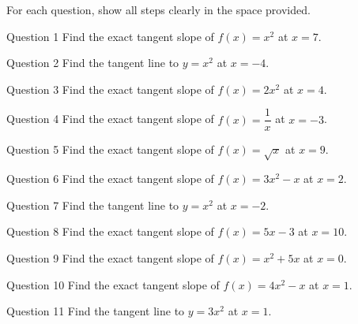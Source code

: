 \documentclass[11pt]{article}
\begin{document}
\clearpage
{}
For each question, show all steps clearly in the space provided.

\begin{qbox}{Question 1}
Find the exact tangent slope of $f(x)=x^2$ at $x=7$.\workspace{2.4cm}
\end{qbox}

\begin{qbox}{Question 2}
Find the tangent line to $y=x^2$ at $x=-4$.\workspace{2.4cm}
\end{qbox}

\begin{qbox}{Question 3}
Find the exact tangent slope of $f(x)=2x^2$ at $x=4$.\workspace{2.4cm}
\end{qbox}

\begin{qbox}{Question 4}
Find the exact tangent slope of $f(x)=\dfrac1x$ at $x=-3$.\workspace{2.4cm}
\end{qbox}

\begin{qbox}{Question 5}
Find the exact tangent slope of $f(x)=\sqrt{x}$ at $x=9$.\workspace{2.4cm}
\end{qbox}

\begin{qbox}{Question 6}
Find the exact tangent slope of $f(x)=3x^2-x$ at $x=2$.\workspace{2.4cm}
\end{qbox}

\begin{qbox}{Question 7}
Find the tangent line to $y=x^2$ at $x=-2$.\workspace{2.4cm}
\end{qbox}

\begin{qbox}{Question 8}
Find the exact tangent slope of $f(x)=5x-3$ at $x=10$.\workspace{2.4cm}
\end{qbox}

\begin{qbox}{Question 9}
Find the exact tangent slope of $f(x)=x^2+5x$ at $x=0$.\workspace{2.4cm}
\end{qbox}

\begin{qbox}{Question 10}
Find the exact tangent slope of $f(x)=4x^2-x$ at $x=1$.\workspace{2.4cm}
\end{qbox}

\begin{qbox}{Question 11}
Find the tangent line to $y=3x^2$ at $x=1$.\workspace{2.4cm}
\end{qbox}
\end{document}
